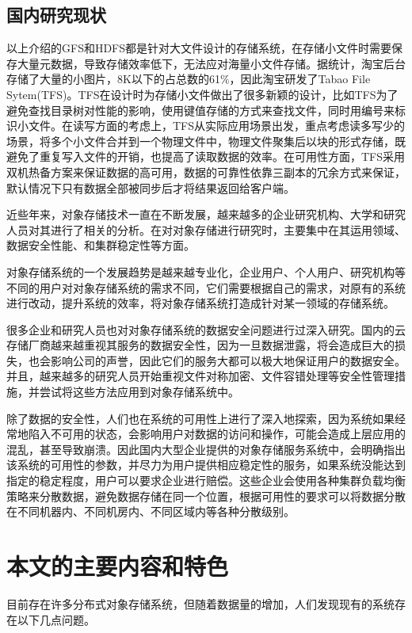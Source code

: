 \subsection{国内研究现状}%
以上介绍的GFS和HDFS都是针对大文件设计的存储系统，在存储小文件时需要保存大量元数据，导致存储效率低下，无法应对海量小文件存储。据统计，淘宝后台存储了大量的小图片，8K以下的占总数的61$\%$\cite{14}，因此淘宝研发了Tabao File Sytem(TFS)\cite{15}。TFS在设计时为存储小文件做出了很多新颖的设计，比如TFS为了避免查找目录树对性能的影响，使用键值存储的方式来查找文件，同时用编号来标识小文件。在读写方面的考虑上，TFS从实际应用场景出发，重点考虑读多写少的场景，将多个小文件合并到一个物理文件中，物理文件聚集后以块的形式存储，既避免了重复写入文件的开销，也提高了读取数据的效率。在可用性方面，TFS采用双机热备\cite{16}方案来保证数据的高可用，数据的可靠性依靠三副本的冗余方式来保证，默认情况下只有数据全部被同步后才将结果返回给客户端。

近些年来，对象存储技术一直在不断发展，越来越多的企业研究机构、大学和研究人员对其进行了相关的分析。在对对象存储进行研究时，主要集中在其运用领域、数据安全性能、和集群稳定性等方面。

对象存储系统的一个发展趋势是越来越专业化，企业用户、个人用户、研究机构等不同的用户对对象存储系统的需求不同，它们需要根据自己的需求，对原有的系统进行改动，提升系统的效率，将对象存储系统打造成针对某一领域的存储系统\cite{17,18}。 

很多企业和研究人员也对对象存储系统的数据安全问题进行过深入研究。国内的云存储厂商越来越重视其服务的数据安全性，因为一旦数据泄露，将会造成巨大的损失，也会影响公司的声誉，因此它们的服务大都可以极大地保证用户的数据安全。并且，越来越多的研究人员开始重视文件对称加密\cite{19}、文件容错处理等安全性管理措施，并尝试将这些方法应用到对象存储系统中。

除了数据的安全性，人们也在系统的可用性上进行了深入地探索，因为系统如果经常地陷入不可用的状态，会影响用户对数据的访问和操作，可能会造成上层应用的混乱，甚至导致崩溃。因此国内大型企业提供的对象存储服务系统中，会明确指出该系统的可用性的参数，并尽力为用户提供相应稳定性的服务，如果系统没能达到指定的稳定程度，用户可以要求企业进行赔偿。这些企业会使用各种集群负载均衡策略来分散数据，避免数据存储在同一个位置，根据可用性的要求可以将数据分散在不同机器内、不同机房内、不同区域内等各种分散级别。

\section{本文的主要内容和特色}%
目前存在许多分布式对象存储系统，但随着数据量的增加，人们发现现有的系统存在以下几点问题。

